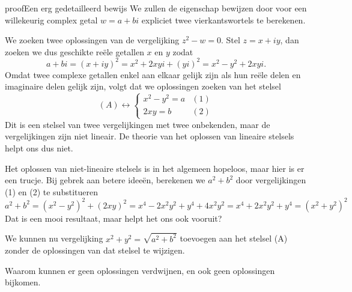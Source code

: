 \documentclass{ximera}
\begin{document}
    \begin{expandable}{proof}{Een erg gedetailleerd bewijs}
        We zullen de eigenschap bewijzen door voor een willekeurig complex getal $w=a+bi$ expliciet twee vierkantswortels te berekenen.

        We zoeken twee oplossingen van de vergelijking $z^2-w=0$. Stel $z=x+iy$, dan zoeken we dus geschikte reële getallen $x$ en $y$ zodat 
        $$
        a+bi = (x+iy)^2 = x^2+2xyi+(yi)^2 = x^2-y^2 +2xyi.
        $$
        Omdat twee complexe getallen enkel aan elkaar gelijk zijn als hun reële delen en imaginaire delen gelijk zijn, volgt dat we oplossingen zoeken van het stelsel
        $$
        (A) \leftrightarrow \begin{cases} x^2 - y^2 = a & (1) \\
                        2xy = b & (2)
        \end{cases}
        $$
        Dit is een stelsel van twee vergelijkingen met twee onbekenden, maar de vergelijkingen zijn niet lineair. De theorie van het oplossen van lineaire stelsels helpt ons dus niet.

        Het oplossen van niet-lineaire stelsels is in het algemeen hopeloos, maar hier is er een trucje.
        Bij gebrek aan betere ideeën, berekenen we $a^2+b^2$ door vergelijkingen (1) en (2) te substitueren
        $$
        a^2+b^2 = (x^2-y^2)^2 + (2xy)^2 = x^4 -2x^2y^2 + y^4 + 4 x^2y^2 = x^4+2x^2y^2 + y^4 = (x^2+y^2)^2
        $$
        Dat is een mooi resultaat, maar helpt het ons ook vooruit?

        We kunnen nu vergelijking $x^2+y^2=\sqrt{a^2+b^2}$ toevoegen aan het stelsel (A) zonder de oplossingen van dat stelsel te wijzigen.

        \begin{quickquestion*}{} Waarom kunnen er geen oplossingen verdwijnen, en ook geen oplossingen bijkomen.\end{quickquestion*}


\end{expandable}
\end{document}
